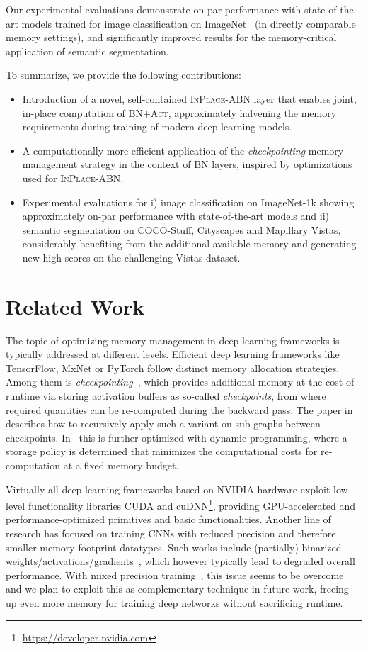 \documentclass[10pt,twocolumn,letterpaper]{article}
\newcommand{\bnInplace}{\textsc{InPlace-ABN}\xspace}
\begin{document}
Our experimental evaluations demonstrate on-par performance with state-of-the-art models trained for image classification on ImageNet~\cite{Rus+15} (in directly comparable memory settings), and significantly improved results for the memory-critical application of semantic segmentation. 

To summarize, we provide the following contributions:
\begin{itemize}
 \item Introduction of a novel, self-contained \bnInplace layer that enables joint, in-place computation of \textsc{BN+Act}, approximately halvening the memory requirements during training of modern deep learning models.
 \item A computationally more efficient application of the \textit{checkpointing} memory management strategy in the context of \textsc{BN} layers, inspired by optimizations used for \bnInplace.
 \item Experimental evaluations for i) image classification on ImageNet-1k showing approximately on-par performance with state-of-the-art models and ii) semantic segmentation on COCO-Stuff, Cityscapes and Mapillary Vistas, considerably benefiting from the additional available memory and generating new high-scores on the challenging Vistas dataset.
\end{itemize}

\section{Related Work}
The topic of optimizing memory management in deep learning frameworks is typically addressed at different levels. Efficient deep learning frameworks like TensorFlow, MxNet or PyTorch follow distinct memory allocation strategies. Among them is \textit{checkpointing}~\cite{Martens2012,Chen+16}, which provides additional memory at the cost of runtime via storing activation buffers as so-called \textit{checkpoints}, from where required quantities can be re-computed during the backward pass. The paper in~\cite{Chen+16} describes how to recursively apply such a variant on sub-graphs between checkpoints. In~\cite{Gruslys2016} this is further optimized with dynamic programming, where a storage policy is determined that minimizes the computational costs for re-computation at a fixed memory budget. 

Virtually all deep learning frameworks based on NVIDIA hardware exploit low-level functionality libraries CUDA and cuDNN\footnote{\url{https://developer.nvidia.com}}, providing GPU-accelerated and performance-optimized primitives and basic functionalities. Another line of research has focused on training CNNs with reduced precision and therefore smaller memory-footprint datatypes. Such works include (partially) binarized weights/activations/gradients~\cite{Courbariaux2015,Hubara2016a,Hubara2016b}, which however typically lead to degraded overall performance. With mixed precision training~\cite{Micikevicius2017}, this issue seems to be overcome and we plan to exploit this as complementary technique in future work, freeing up even more memory for training deep networks without sacrificing runtime.
\end{document}
